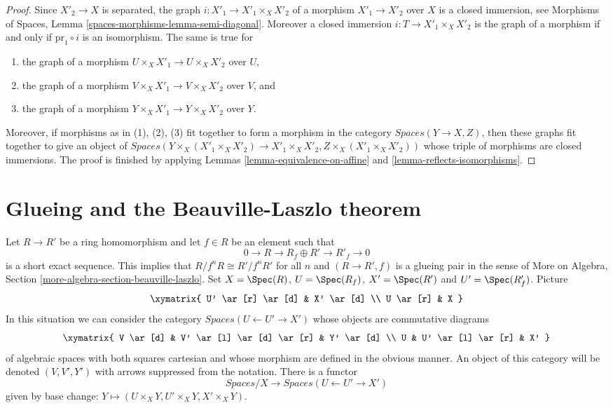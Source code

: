 \begin{proof}
Since $X'_2 \to X$ is separated, the graph $i : X'_1 \to X'_1 \times_X X'_2$
of a morphism $X'_1 \to X'_2$ over $X$ is a closed immersion, see
Morphisms of Spaces, Lemma \ref{spaces-morphisms-lemma-semi-diagonal}.
Moreover a closed immersion $i : T \to X'_1 \times_X X'_2$ is the graph of a
morphism if and only if $\text{pr}_1 \circ i$ is an isomorphism.
The same is true for
\begin{enumerate}
\item the graph of a morphism $U \times_X X'_1 \to U \times_X X'_2$ over $U$,
\item the graph of a morphism $V \times_X X'_1 \to V \times_X X'_2$ over $V$,
and
\item the graph of a morphism $Y \times_X X'_1 \to Y \times_X X'_2$ over $Y$.
\end{enumerate}
Moreover, if morphisms as in (1), (2), (3) fit together to form a
morphism in the category $\textit{Spaces}(Y \to X, Z)$, then these
graphs fit together to give an object of
$\textit{Spaces}(Y \times_X (X'_1 \times_X X'_2) \to X'_1 \times_X X'_2,
Z \times_X (X'_1 \times_X X'_2))$
whose triple of morphisms are closed immersions. The proof is finished
by applying Lemmas \ref{lemma-equivalence-on-affine} and
\ref{lemma-reflects-isomorphisms}.
\end{proof}









\section{Glueing and the Beauville-Laszlo theorem}
\label{section-glueing-beauville-laszlo}

\noindent
Let $R \to R'$ be a ring homomorphism and let $f \in R$ be an element such that
$$
0 \to R \to R_f \oplus R' \to R'_f \to 0
$$
is a short exact sequence. This implies that $R/f^nR \cong R'/f^nR'$
for all $n$ and $(R \to R', f)$ is a glueing pair in the sense of
More on Algebra, Section \ref{more-algebra-section-beauville-laszlo}.
Set $X = \Spec(R)$, $U = \Spec(R_f)$, $X' = \Spec(R')$ and
$U' = \Spec(R'_f)$. Picture
$$
\xymatrix{
U' \ar[r] \ar[d] & X' \ar[d] \\
U \ar[r] & X
}
$$
In this situation we can consider the category
$\textit{Spaces}(U \leftarrow U' \to X')$ whose objects
are commutative diagrams
$$
\xymatrix{
V \ar[d] & V' \ar[l] \ar[d] \ar[r] & Y' \ar[d] \\
U & U' \ar[l] \ar[r] & X'
}
$$
of algebraic spaces with both squares cartesian and whose morphism
are defined in the obvious manner. An object of this category will
be denoted $(V, V', Y')$ with arrows suppressed from the notation.
There is a functor
\begin{equation}
\label{equation-beauville-laszlo-glueing-spaces}
\textit{Spaces}/X
\longrightarrow
\textit{Spaces}(U \leftarrow U' \to X')
\end{equation}
given by base change: $Y \mapsto (U \times_X Y, U' \times_X Y, X' \times_X Y)$.

